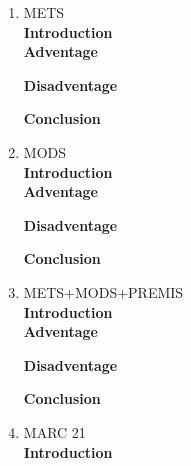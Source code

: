 \begin{enumerate}
	\item METS\\
	{\bf Introduction}\\
	
	{\bf Adventage}\\
	\begin{enumerate}
		
	\end{enumerate}	
	{\bf Disadventage}\\
	\begin{enumerate}
		
	\end{enumerate}
	{\bf Conclusion}\\	
	
	\item MODS\\
	{\bf Introduction}\\
	
	{\bf Adventage}\\
	\begin{enumerate}
		
	\end{enumerate}	
	{\bf Disadventage}\\
	\begin{enumerate}
		
	\end{enumerate}
	{\bf Conclusion}\\
	
	\item METS+MODS+PREMIS\\
	{\bf Introduction}\\
	
	{\bf Adventage}\\
	\begin{enumerate}
		
	\end{enumerate}	
	{\bf Disadventage}\\
	\begin{enumerate}
		
	\end{enumerate}
	{\bf Conclusion}\\
	
	\item MARC 21\\
	{\bf Introduction}\\
	

\end{enumerate}

